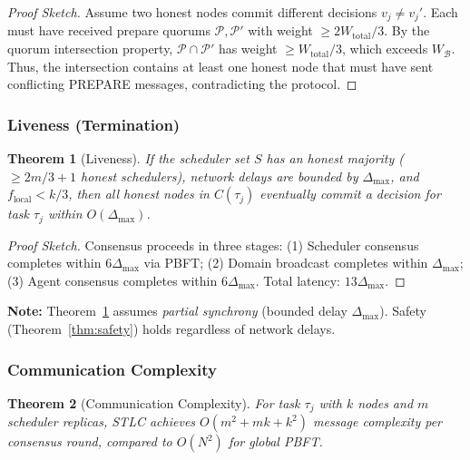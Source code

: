 \documentclass[lettersize,journal]{IEEEtran}
\newtheorem{theorem}{Theorem}
\begin{document}
\begin{proof}[Proof Sketch]
Assume two honest nodes commit different decisions $v_j \neq v_j'$. Each
must have received prepare quorums $\mathcal{P}, \mathcal{P}'$ with
weight $\geq 2W_{\text{total}}/3$. By the quorum intersection
property, $\mathcal{P} \cap \mathcal{P}'$ has weight
$\geq W_{\text{total}}/3$, which exceeds $W_{\mathcal{B}}$. Thus,
the intersection contains at least one honest node that must have sent
conflicting PREPARE messages, contradicting the protocol.
\end{proof}

\subsubsection{Liveness (Termination)}
\label{sec:liveness_theorem}

\begin{theorem}[Liveness]
\label{thm:liveness}
If the scheduler set $S$ has an honest majority ($\geq 2m/3 + 1$ honest
schedulers), network delays are bounded by $\Delta_{\max}$, and
$f_{\text{local}} < k/3$, then all honest nodes in $C(\tau_j)$ eventually
commit a decision for task $\tau_j$ within $O(\Delta_{\max})$.
\end{theorem}

\begin{proof}[Proof Sketch]
Consensus proceeds in three stages: (1) Scheduler consensus completes
within $6\Delta_{\max}$ via PBFT; (2) Domain broadcast completes within
$\Delta_{\max}$; (3) Agent consensus completes within $6\Delta_{\max}$.
Total latency: $13\Delta_{\max}$.
\end{proof}

\textbf{Note:} Theorem~\ref{thm:liveness} assumes \textit{partial synchrony} (bounded delay $\Delta_{\max}$). Safety
(Theorem~\ref{thm:safety}) holds regardless of network delays.

\subsubsection{Communication Complexity}
\label{sec:complexity_theorem}

\begin{theorem}[Communication Complexity]
\label{thm:complexity}
For task $\tau_j$ with $k$ nodes and $m$ scheduler replicas,
STLC achieves $O(m^2 + mk + k^2)$ message complexity per consensus round,
compared to $O(N^2)$ for global PBFT.
\end{theorem}
\end{document}
